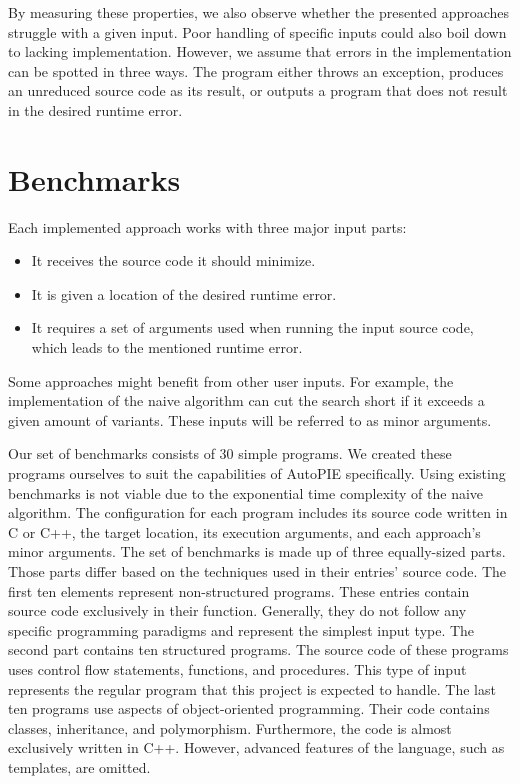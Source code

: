 By measuring these properties, we also observe whether the presented 
approaches struggle with a given input. 
Poor handling of specific inputs could also boil down to lacking 
implementation. 
However, we assume that errors in the implementation can be spotted in three 
ways. 
The program either throws an exception, produces an unreduced source code as 
its result, or outputs a program that does not result in the desired runtime 
error.

\section{Benchmarks}

Each implemented approach works with three major input parts:
\begin{itemize}
  \item It receives the source code it should minimize.
  \item It is given a location of the desired runtime error.
  \item It requires a set of arguments used when running the input source 
  code, which leads to the mentioned runtime error.
\end{itemize}
Some approaches might benefit from other user inputs. 
For example, the implementation of the naive algorithm can cut the search 
short if it exceeds a given amount of variants. 
These inputs will be referred to as minor arguments.

Our set of benchmarks consists of 30 simple programs. 
We created these programs ourselves to suit the capabilities of AutoPIE 
specifically. 
Using existing benchmarks is not viable due to the exponential time 
complexity of the naive algorithm.
The configuration for each program includes its source code written in C or 
C++, the target location, its execution arguments, and each approach's 
minor arguments. 
The set of benchmarks is made up of three equally-sized parts. 
Those parts differ based on the techniques used in their entries' source code. 
The first ten elements represent non-structured programs. 
These entries contain source code exclusively in their  function. 
Generally, they do not follow any specific programming paradigms and 
represent the simplest input type. 
The second part contains ten structured programs. 
The source code of these programs uses control flow statements, functions, 
and procedures. 
This type of input represents the regular program that this project is 
expected to handle. 
The last ten programs use aspects of object-oriented programming. 
Their code contains classes, inheritance, and polymorphism. 
Furthermore, the code is almost exclusively written in C++. 
However, advanced features of the language, such as templates, are omitted.

